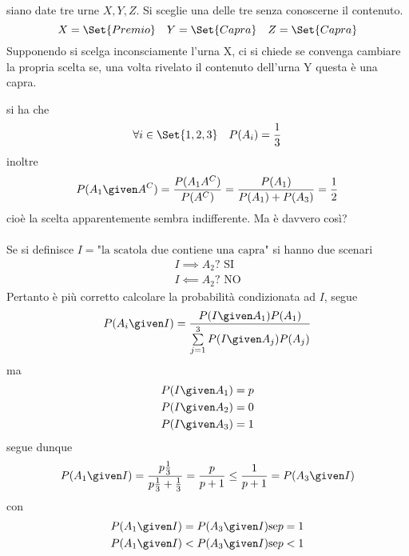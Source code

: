 \documentclass{subfiles}
\begin{document}
\begin{Exercise*}
    siano date tre urne \(X, Y, Z\). Si sceglie una delle tre senza conoscerne il contenuto.
    \[
        X = \Set{Premio} \quad Y = \Set{Capra} \quad Z = \Set{Capra}
    \]
    Supponendo si scelga inconsciamente l'urna X, ci si chiede se convenga cambiare la propria scelta se, una volta rivelato il contenuto dell'urna Y questa è una capra.

    \begin{Solution*}
        si ha che
        \[
            \forall i \in \Set{1, 2, 3} \quad P(A_{i}) = \frac{1}{3}
        \]
        inoltre
        \[
            P(A_{1} \given A^{C}) = \frac{P(A_{1}A^{C})}{P(A^{C})} = \frac{P(A_{1})}{P(A_{1}) + P(A_{3})} = \frac{1}{2}
        \]
        cioè la scelta apparentemente sembra indifferente. Ma è davvero così?
        \\ \\
        Se si definisce \(I = \text{"la scatola due contiene una capra"}\) si hanno due scenari
        \[\begin{gathered}
                I \implies A_{2} \text{? SI} \\
                I \impliedby A_{2} \text{? NO}
            \end{gathered}\]
        Pertanto è più corretto calcolare la probabilità condizionata ad \(I\), segue
        \[
            P(A_{i} \given I) = \frac{P(I \given A_{1})P(A_{1})}{\sum\limits_{j = 1}^{3}{P(I \given A_{j})P(A_{j})}}
        \]
        ma
        \[\begin{gathered}
                P(I \given A_{1}) = p \\
                P(I \given A_{2}) = 0 \\
                P(I \given A_{3}) = 1 \\
            \end{gathered}\]
        segue dunque
        \[
            P(A_{1} \given I) = \frac{p\frac{1}{3}}{p\frac{1}{3} + \frac{1}{3}} = \frac{p}{p + 1} \leq \frac{1}{p + 1} = P(A_{3} \given I)
        \]
        con
        \[\begin{gathered}
                P(A_{1} \given I) = P(A_{3} \given I) \text{se} p = 1 \\
                P(A_{1} \given I) < P(A_{3} \given I) \text{se} p < 1\\
            \end{gathered}\]
    \end{Solution*}
\end{Exercise*}
\end{document}
